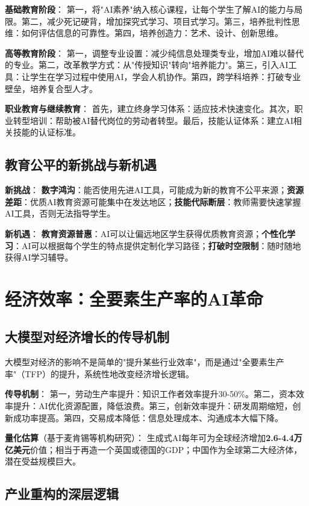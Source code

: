 \textbf{基础教育阶段}：
第一，将"AI素养"纳入核心课程，让每个学生了解AI的能力与局限。第二，减少死记硬背，增加探究式学习、项目式学习。第三，培养批判性思维：如何评估信息的可靠性。第四，培养创造力：艺术、设计、创新思维。

\textbf{高等教育阶段}：
第一，调整专业设置：减少纯信息处理类专业，增加AI难以替代的专业。第二，改革教学方式：从"传授知识"转向"培养能力"。第三，引入AI工具：让学生在学习过程中使用AI，学会人机协作。第四，跨学科培养：打破专业壁垒，培养复合型人才。

\textbf{职业教育与继续教育}：
首先，建立终身学习体系：适应技术快速变化。其次，职业转型培训：帮助被AI替代岗位的劳动者转型。最后，技能认证体系：建立AI相关技能的认证标准。

\subsection{教育公平的新挑战与新机遇}

\textbf{新挑战}：
\textbf{数字鸿沟}：能否使用先进AI工具，可能成为新的教育不公平来源；\textbf{资源差距}：优质AI教育资源可能集中在发达地区；\textbf{技能代际断层}：教师需要快速掌握AI工具，否则无法指导学生。

\textbf{新机遇}：
\textbf{教育资源普惠}：AI可以让偏远地区学生获得优质教育资源；\textbf{个性化学习}：AI可以根据每个学生的特点提供定制化学习路径；\textbf{打破时空限制}：随时随地获得AI学习辅导。

\section{经济效率：全要素生产率的AI革命}

\subsection{大模型对经济增长的传导机制}

大模型对经济的影响不是简单的"提升某些行业效率"，而是通过"全要素生产率"（TFP）的提升，系统性地改变经济增长逻辑。

\textbf{传导机制}：
第一，劳动生产率提升：知识工作者效率提升30-50\%。第二，资本效率提升：AI优化资源配置，降低浪费。第三，创新效率提升：研发周期缩短，创新成功率提高。第四，交易成本降低：信息处理成本、沟通成本大幅下降。

\textbf{量化估算}（基于麦肯锡等机构研究）：
生成式AI每年可为全球经济增加\textbf{2.6-4.4万亿美元}价值；相当于再造一个英国或德国的GDP；中国作为全球第二大经济体，潜在受益规模巨大。

\subsection{产业重构的深层逻辑}

